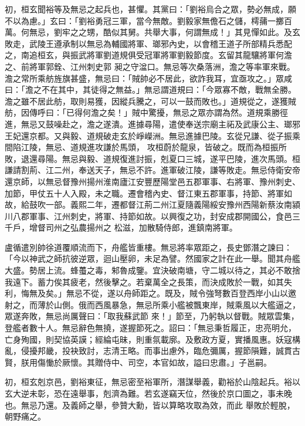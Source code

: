 \begin{pinyinscope}
 初，桓玄聞裕等及無忌之起兵也，甚懼。其黨曰：「劉裕烏合之眾，勢必無成，願不以為慮。」玄曰：「劉裕勇冠三軍，當今無敵。劉毅家無儋石之儲，樗蒱一擲百萬。何無忌，劉牢之之甥，酷似其舅。共舉大事，何謂無成！」其見憚如此。及玄敗走，武陵王遵承制以無忌為輔國將軍、瑯邪內史，以會稽王道子所部精兵悉配之，南追桓玄，與振武將軍劉道規俱受冠軍將軍劉毅節度。玄留其龍驤將軍何澹之、前將軍郭銓、江州刺史郭
 昶之守湓口。無忌等次桑落洲，澹之等率軍來戰。澹之常所乘舫旌旗甚盛，無忌曰：「賊帥必不居此，欲詐我耳，宜亟攻之。」眾咸曰：「澹之不在其中，其徒得之無益。」無忌謂道規曰：「今眾寡不敵，戰無全勝。澹之雖不居此舫，取則易獲，因縱兵騰之，可以一鼓而敗也。」道規從之，遂獲賊舫，因傳呼曰：「已得何澹之矣！」賊中驚擾，無忌之眾亦謂為然。道規乘勝徑進，無忌又鼓噪赴之，澹之遂潰。進據尋陽，遣使奉送宗廟主祏及武康公主、瑯邪王妃還京都。又與毅、道規破走玄於崢嶸洲。無忌進據巴陵。玄從兄謙、從子振乘間陷江陵，無忌、道規進攻謙於馬頭，
 攻桓蔚於龍泉，皆破之。既而為桓振所敗，退還尋陽。無忌與毅、道規復進討振，剋夏口三城，遂平巴陵，進次馬頭。桓謙請割荊、江二州，奉送天子，無忌不許。進軍破江陵，謙等敗走。無忌侍衛安帝還京師，以無忌督豫州揚州淮南廬江安豐歷陽堂邑五郡軍事、右將軍、豫州刺史、加節，甲仗五十人入殿，未之職。遷會稽內史、督江東五郡軍事，持節、將軍如故，給鼓吹一部。義熙二年，遷都督江荊二州江夏隨義陽綏安豫州西陽新蔡汝南潁川八郡軍事、江州刺史，將軍、持節如故。以興復之功，封安成郡開國公，食邑三千戶，增督司州之弘農揚州之
 松滋，加散騎侍郎，進鎮南將軍。



 盧循遣別帥徐道覆順流而下，舟艦皆重樓。無忌將率眾距之，長史鄧潛之諫曰：「今以神武之師抗彼逆眾，迴山壓卵，未足為譬。然國家之計在此一舉。聞其舟艦大盛。勢居上流。蜂蠆之毒，邾魯成鑒。宜決破南塘，守二城以待之，其必不敢捨我遠下。蓄力俟其疲老，然後擊之。若棄萬全之長策，而決成敗於一戰，如其失利，悔無及矣。」無忌不從，遂以舟師距之。既及，賊令強弩數百登西岸小山以邀射之，而薄於山側。俄而西風暴急，無忌所乘小艦被飄東岸，賊乘風以大艦逼之，眾遂奔敗，無忌尚厲聲曰：「取我蘇武節
 來！」節至，乃躬執以督戰。賊眾雲集，登艦者數十人。無忌辭色無撓，遂握節死之。詔曰：「無忌秉哲履正，忠亮明允，亡身殉國，則契協英謨；經綸屯昧，則重氛載廓。及敷政方夏，實播風惠。妖寇構亂，侵擾邦畿，投袂致討，志清王略。而事出慮外，臨危彌厲，握節隕難，誠貫古賢，朕用傷慟於厥懷。其贈侍中、司空，本官如故，謚曰忠肅。」子邕嗣。



 初，桓玄剋京邑，劉裕東征，無忌密至裕軍所，潛謀舉義，勸裕於山陰起兵。裕以玄大逆未彰，恐在遠舉事，剋濟為難。若玄遂竊天位，然後於京口圖之，事未晚也。無忌乃還。及義師之舉，參贊大勳，皆以算略攻取為效，而此
 舉敗於輕脫，朝野痛之。




\end{pinyinscope}
